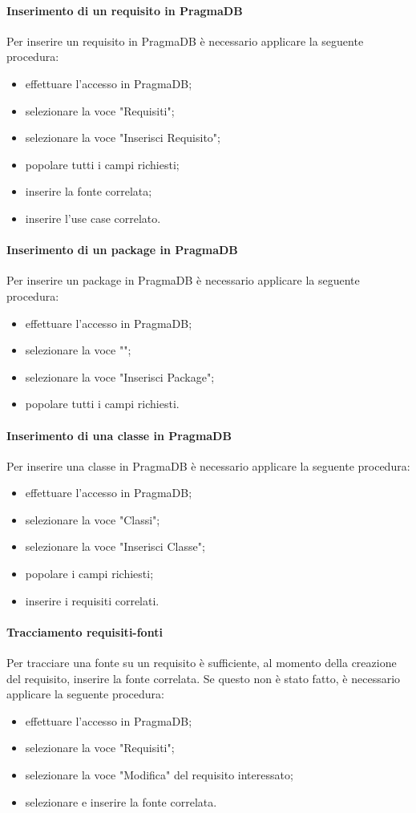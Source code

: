  \paragraph{Inserimento di un requisito in PragmaDB}
 Per inserire un requisito in PragmaDB è necessario applicare la seguente procedura:
 \begin{itemize}
 	\item effettuare l'accesso in PragmaDB;
 	\item selezionare la voce "Requisiti";
 	\item selezionare la voce "Inserisci Requisito";
 	\item popolare tutti i campi richiesti;
 	\item inserire la fonte correlata;
 	\item inserire l'use case correlato.
 \end{itemize}
 \paragraph{Inserimento di un package in PragmaDB}
 Per inserire un package in PragmaDB è necessario applicare la seguente procedura:
 \begin{itemize}
 	\item effettuare l'accesso in PragmaDB;
 	\item selezionare la voce "";
 	\item selezionare la voce "Inserisci Package";
 	\item popolare tutti i campi richiesti.
 \end{itemize}
 \paragraph{Inserimento di una classe in PragmaDB}
 Per inserire una classe in PragmaDB è necessario applicare la seguente procedura:
 \begin{itemize}
 	\item effettuare l'accesso in PragmaDB;
 	\item selezionare la voce "Classi";
 	\item selezionare la voce "Inserisci Classe";
 	\item popolare i campi richiesti;
 	\item inserire i requisiti correlati.
 \end{itemize}
 \paragraph{Tracciamento requisiti-fonti}
 Per tracciare una fonte su un requisito è sufficiente, al momento della creazione del requisito, inserire la fonte correlata. Se questo non è stato fatto, è necessario applicare la seguente procedura:
 \begin{itemize}
 	\item effettuare l'accesso in PragmaDB;
 	\item selezionare la voce "Requisiti";
 	\item selezionare la voce "Modifica" del requisito interessato;
 	\item selezionare e inserire la fonte correlata.
 \end{itemize}
